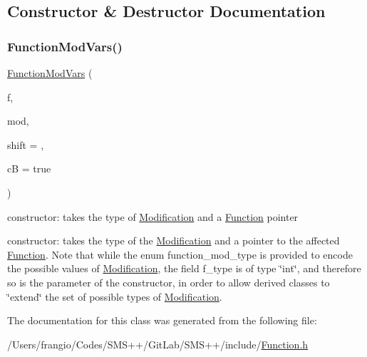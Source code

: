 \subsection{Constructor \& Destructor Documentation}
\mbox{\label{class_s_m_spp__di__unipi__it_1_1_function_mod_vars_a78ac9112c0a12acc7508bd038c75b81c}} 
\subsubsection{\texorpdfstring{Function\+Mod\+Vars()}{FunctionModVars()}}
{\footnotesize\ttfamily \mbox{\hyperlink{class_s_m_spp__di__unipi__it_1_1_function_mod_vars}{Function\+Mod\+Vars}} (\begin{DoxyParamCaption}\item[{\mbox{\hyperlink{class_s_m_spp__di__unipi__it_1_1_function}{Function}} $\ast$const}]{f,  }\item[{const int}]{mod,  }\item[{const \mbox{\hyperlink{class_s_m_spp__di__unipi__it_1_1_function_mod_a44f54e31f9fa8a29194218c234876284}{Function\+Value}}}]{shift = {},  }\item[{const bool}]{cB = {\ttfamily true} }\end{DoxyParamCaption})\hspace{0.3cm}{\ttfamily [inline]}}



constructor\+: takes the type of \mbox{\hyperlink{class_s_m_spp__di__unipi__it_1_1_modification}{Modification}} and a \mbox{\hyperlink{class_s_m_spp__di__unipi__it_1_1_function}{Function}} pointer 

constructor\+: takes the type of the \mbox{\hyperlink{class_s_m_spp__di__unipi__it_1_1_modification}{Modification}} and a pointer to the affected \mbox{\hyperlink{class_s_m_spp__di__unipi__it_1_1_function}{Function}}. Note that while the enum function\+\_\+mod\+\_\+type is provided to encode the possible values of \mbox{\hyperlink{class_s_m_spp__di__unipi__it_1_1_modification}{Modification}}, the field f\+\_\+type is of type \char`\"{}int\char`\"{}, and therefore so is the parameter of the constructor, in order to allow derived classes to \char`\"{}extend\char`\"{} the set of possible types of \mbox{\hyperlink{class_s_m_spp__di__unipi__it_1_1_modification}{Modification}}. 

The documentation for this class was generated from the following file\+:\begin{DoxyCompactItemize}
\item 
/\+Users/frangio/\+Codes/\+S\+M\+S++/\+Git\+Lab/\+S\+M\+S++/include/\mbox{\hyperlink{_function_8h}{Function.\+h}}\end{DoxyCompactItemize}
